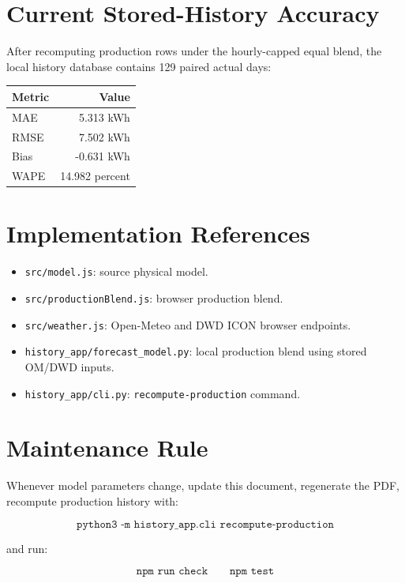 \documentclass[11pt,a4paper]{article}
\begin{document}
\section{Current Stored-History Accuracy}

After recomputing production rows under the hourly-capped equal blend, the local history database contains 129 paired actual days:

\begin{center}
\begin{tabular}{lr}
\toprule
Metric & Value \\
\midrule
MAE & 5.313 kWh \\
RMSE & 7.502 kWh \\
Bias & -0.631 kWh \\
WAPE & 14.982 percent \\
\bottomrule
\end{tabular}
\end{center}

\section{Implementation References}

\begin{itemize}
  \item \texttt{src/model.js}: source physical model.
  \item \texttt{src/productionBlend.js}: browser production blend.
  \item \texttt{src/weather.js}: Open-Meteo and DWD ICON browser endpoints.
  \item \texttt{history\_app/forecast\_model.py}: local production blend using stored OM/DWD inputs.
  \item \texttt{history\_app/cli.py}: \texttt{recompute-production} command.
\end{itemize}

\section{Maintenance Rule}

Whenever model parameters change, update this document, regenerate the PDF, recompute production history with:

\[
\texttt{python3 -m history\_app.cli recompute-production}
\]

and run:

\[
\texttt{npm run check}
\qquad
\texttt{npm test}
\]
\end{document}
